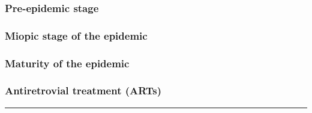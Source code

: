\subsubsection{Pre-epidemic stage}
\subsubsection{Miopic stage of the epidemic}
\subsubsection{Maturity of the epidemic}
\subsubsection{Antiretrovial treatment (ARTs)}


\rule{\linewidth}{0.0009\textheight}
